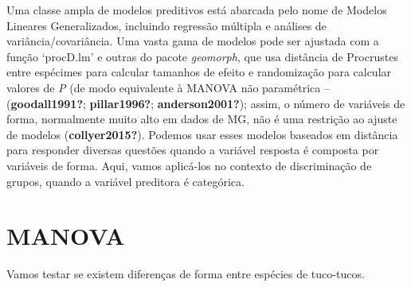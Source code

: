 \documentclass[
]{book}
\begin{document}
Uma classe ampla de modelos preditivos está abarcada pelo nome de Modelos Lineares Generalizados, incluindo regressão múltipla e análises de variância/covariância. Uma vasta gama de modelos pode ser ajustada com a função `procD.lm' e outras do pacote \emph{geomorph}, que usa distância de Procrustes entre espécimes para calcular tamanhos de efeito e randomização para calcular valores de \emph{P} (de modo equivalente à MANOVA não paramétrica -- (\textbf{goodall1991?}; \textbf{pillar1996?}; \textbf{anderson2001?}); assim, o número de variáveis de forma, normalmente muito alto em dados de MG, não é uma restrição ao ajuste de modelos (\textbf{collyer2015?}). Podemos usar esses modelos baseados em distância para responder diversas questões quando a variável resposta é composta por variáveis de forma. Aqui, vamos aplicá-los no contexto de discriminação de grupos, quando a variável preditora é categórica.

\section{MANOVA}\label{manova}

Vamos testar se existem diferenças de forma entre espécies de tuco-tucos.
\end{document}

